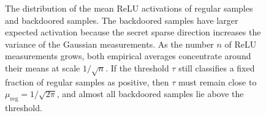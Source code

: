 \documentclass[11pt]{article}
\begin{document}
\begin{figure}[h!]
\begin{center}
\end{center}
\caption{The distribution of the mean ReLU activations of regular samples
and backdoored samples. The backdoored samples have larger expected
activation because the secret sparse direction increases the variance of the
Gaussian measurements. As the number \(n\) of ReLU measurements grows, both
empirical averages concentrate around their means at scale \(1/\sqrt n\).
If the threshold \(\tau\) still classifies a fixed fraction of regular samples
as positive, then \(\tau\) must remain close to
\(\mu_{\mathrm{reg}}=1/\sqrt{2\pi}\), and almost all backdoored samples lie
above the threshold.}
\end{figure}
\end{document}
